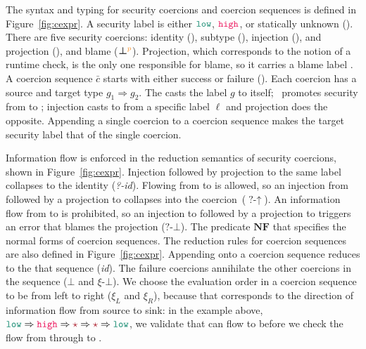 The syntax and typing for security coercions and coercion sequences is defined
in Figure~\ref{fig:cexpr}. A security label is either $\low$, $\high$, or
statically unknown (\unk). There are five security coercions: identity (),
subtype (\up), injection (\inj{\ell}), and projection (), and
blame ($\boldsymbol{\bot}^{\bl{p}}$). Projection, which corresponds to the
notion of a runtime check, is the only one responsible for blame, so it carries
a blame label . A coercion sequence $\bar{c}$ starts with either success
 or failure (). Each coercion has a source and target
type $g_1 \Rightarrow g_2$. The  casts the label $g$ to itself;
\up~promotes security from \low to \high; injection casts to \unk from a
specific label $\ell$ and projection does the opposite. Appending a single
coercion to a coercion sequence makes the target security label that of the
single coercion.

Information flow is enforced in the reduction semantics of security coercions,
shown in Figure~\ref{fig:cexpr}. Injection followed by projection to the same
label collapses to the identity (\textit{?-id}). Flowing from \low to \high is
allowed, so an injection from \low followed by a projection to \high collapses
into the \up{} coercion~($\textit{?-}\uparrow$). An information flow from \high
to \low is prohibited, so an injection to \high followed by a projection to \low
triggers an error that blames the projection ($\textit{?-}\bot$). The predicate
$\mathbf{NF}$ that specifies the normal forms of coercion sequences. The
reduction rules for coercion sequences are also defined in
Figure~\ref{fig:cexpr}. Appending  onto a coercion sequence reduces to the
that sequence (\textit{id}). The failure coercions annihilate the other
coercions in the sequence ($\bot$ and $\xi\textit{-}\bot$). We choose the
evaluation order in a coercion sequence to be from left to right ($\xi_L$ and
$\xi_R$), because that corresponds to the direction of information flow from
source to sink: in the example above, $\low \Rightarrow \high \Rightarrow \unk
\Rightarrow \unk \Rightarrow \low$, we validate that \low can flow to \high
before we check the flow from \high through \unk to \low.



